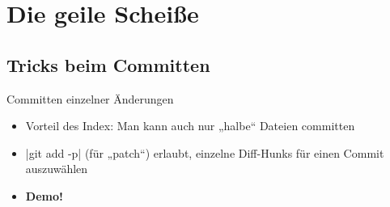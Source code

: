 \section{Die geile Scheiße}

\subsection{Tricks beim Committen}

\begin{frame}{Committen einzelner Änderungen}
\begin{itemize}
	\item Vorteil des Index: Man kann auch nur „halbe“ Dateien committen
	\item \TYPE|git add -p| (für „patch“) erlaubt, einzelne Diff-Hunks für einen Commit auszuwählen
	\item \textbf{Demo!}
\end{itemize}
\end{frame}




